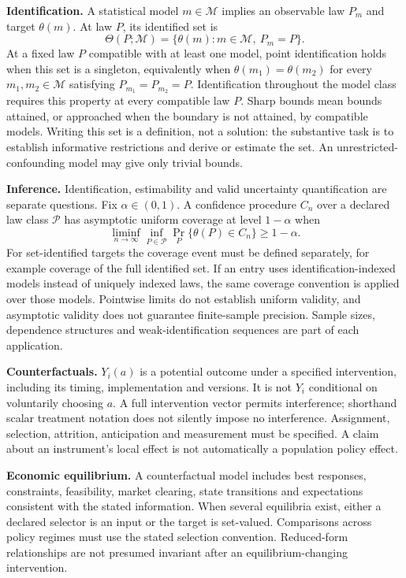 \documentclass[11pt,a4paper]{article}
\begin{document}
\textbf{Identification.} A statistical model $m\in\mathcal M$ implies an observable law $P_m$ and target $\theta(m)$. At law $P$, its identified set is
\[
\Theta(P;\mathcal M)=\{\theta(m):m\in\mathcal M,\ P_m=P\}.
\]
At a fixed law $P$ compatible with at least one model, point identification holds when this set is a singleton, equivalently when $\theta(m_1)=\theta(m_2)$ for every $m_1,m_2\in\mathcal M$ satisfying $P_{m_1}=P_{m_2}=P$. Identification throughout the model class requires this property at every compatible law $P$. Sharp bounds mean bounds attained, or approached when the boundary is not attained, by compatible models. Writing this set is a definition, not a solution: the substantive task is to establish informative restrictions and derive or estimate the set. An unrestricted-confounding model may give only trivial bounds.

\textbf{Inference.} Identification, estimability and valid uncertainty quantification are separate questions. Fix $\alpha\in(0,1)$. A confidence procedure $C_n$ over a declared law class $\mathcal P$ has asymptotic uniform coverage at level $1-\alpha$ when
\[
\liminf_{n\to\infty}\inf_{P\in\mathcal P}\Pr_P\{\theta(P)\in C_n\}\geq1-\alpha.
\]
For set-identified targets the coverage event must be defined separately, for example coverage of the full identified set. If an entry uses identification-indexed models instead of uniquely indexed laws, the same coverage convention is applied over those models. Pointwise limits do not establish uniform validity, and asymptotic validity does not guarantee finite-sample precision. Sample sizes, dependence structures and weak-identification sequences are part of each application.

\textbf{Counterfactuals.} $Y_i(a)$ is a potential outcome under a specified intervention, including its timing, implementation and versions. It is not $Y_i$ conditional on voluntarily choosing $a$. A full intervention vector permits interference; shorthand scalar treatment notation does not silently impose no interference. Assignment, selection, attrition, anticipation and measurement must be specified. A claim about an instrument's local effect is not automatically a population policy effect.

\textbf{Economic equilibrium.} A counterfactual model includes best responses, constraints, feasibility, market clearing, state transitions and expectations consistent with the stated information. When several equilibria exist, either a declared selector is an input or the target is set-valued. Comparisons across policy regimes must use the stated selection convention. Reduced-form relationships are not presumed invariant after an equilibrium-changing intervention.
\end{document}

